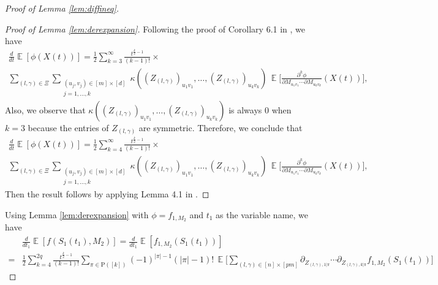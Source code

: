 \documentclass[11pt]{amsart}
\numberwithin{equation}{section}
\numberwithin{equation}{section}
\DeclareMathOperator{\E}{\mathbb{E}}
\theoremstyle{remark}
\theoremstyle{definition}
\begin{document}
\begin{proof}[Proof of Lemma \ref{lem:diffineq}]
\begin{proof}[Proof of Lemma \ref{lem:derexpansion}]
Following the proof of Corollary 6.1 in \cite{brailovskaya2022universality}, we have
\begin{multline*}
	\frac{d}{dt}\E[\phi(X(t))] =
	\frac{1}{2}\sum_{k=3}^\infty
	\frac{t^{\frac{k}{2}-1}}{(k-1)!}\times\mbox{}\\
	\sum_{(l,\gamma) \in \Xi}
	\sum_{\substack{(u_j,v_j)\in[m] \times [d]\\
	j=1,\ldots,k}}
	\kappa((Z_{(l,\gamma)})_{u_1v_1},\ldots,(Z_{(l,\gamma)})_{u_kv_k})\,
	\E\bigg[
	\frac{\partial^k\phi}{\partial  M_{u_1v_1}\cdots
	\partial M_{u_kv_k}}(X(t))
	\bigg],
\end{multline*}
Also, we observe that $\kappa((Z_{(l,\gamma)})_{u_1v_1},\ldots,(Z_{(l,\gamma)})_{u_kv_k})$ is always $0$ when $k=3$ because the entries of $Z_{(l,\gamma)}$ are symmetric.
Therefore, we conclude that
\begin{multline*}
	\frac{d}{dt}\E[\phi(X(t))] =
	\frac{1}{2}\sum_{k=4}^\infty
	\frac{t^{\frac{k}{2}-1}}{(k-1)!}\times\mbox{}\\
	\sum_{(l,\gamma) \in \Xi}
	\sum_{\substack{(u_j,v_j)\in[m] \times [d]\\
	j=1,\ldots,k}}
	\kappa((Z_{(l,\gamma)})_{u_1v_1},\ldots,(Z_{(l,\gamma)})_{u_kv_k})\,
	\E\bigg[
	\frac{\partial^k\phi}{\partial  M_{u_1v_1}\cdots
	\partial M_{u_kv_k}}(X(t))
	\bigg],
\end{multline*}
Then the result follows by applying Lemma 4.1 in \cite{brailovskaya2022universality}.
\end{proof}

Using Lemma \ref{lem:derexpansion} with $\phi=f_{1,M_2}$ and $t_1$ as the variable name, we have
\begin{align*}
	&\frac{d}{dt_1}\E[f(S_1(t_1),M_2)]=\frac{d}{dt_1}\E[f_{1,M_2}(S_1(t_1))]
 \\=& 
	\frac{1}{2}\sum_{k=4}^{2q}
	\frac{t^{\frac{k}{2}-1}}{(k-1)!}
	\sum_{\pi\in\mathrm{P}([k])}
	(-1)^{|\pi|-1}(|\pi|-1)!\,
	\E\Bigg[ \sum_{(l,\gamma) \in [n] \times [pm]} \partial_{Z_{(l,\gamma),1|\pi}}\cdots\partial_{Z_{(l,\gamma),k|\pi}}f_{1,M_2}(S_1(t_1))
	\Bigg]
\end{align*}


\end{proof}
\end{document}

